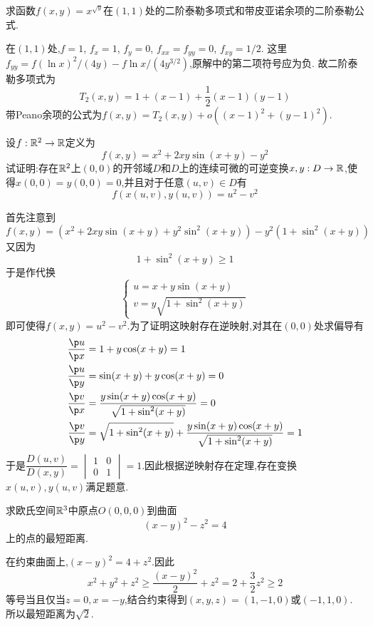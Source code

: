 \documentclass{ctexart}
\begin{document}
\begin{problem}[5.(15\songti{分})]
求函数$f(x,y)=x^{\sqrt{y}}$在$(1,1)$处的二阶泰勒多项式和带皮亚诺余项的二阶泰勒公式.
\end{problem}
\begin{solution}
在$(1,1)$处,$f=1$, $f_x=1$, $f_y=0$, $f_{xx}=f_{yy}=0$, $f_{xy}=1/2$.
这里$f_{yy}=f(\ln x)^2/(4y)-f\ln x/(4y^{3/2})$,原解中的第二项符号应为负.
故二阶泰勒多项式为
\[T_2(x,y)=1+(x-1)+\dfrac12(x-1)(y-1)\]
带Peano余项的公式为$f(x,y)=T_2(x,y)+o((x-1)^2+(y-1)^2)$.
\end{solution}
\begin{problem}[6.(15\songti{分})]
设$f:\mathbb{R}^2\to\mathbb{R}$定义为
        \[f(x,y)=x^2+2xy\sin(x+y)-y^2\]
        试证明:存在$\mathbb{R}^2$上$(0,0)$的开邻域$D$和$D$上的连续可微的可逆变换$x,y:D\to\mathbb{R}$,使得$x(0,0)=y(0,0)=0$,并且对于任意$(u,v)\in D$有
        \[f(x(u,v),y(u,v))=u^2-v^2\]
\end{problem}
\begin{solution}
首先注意到
    \[f(x,y)=\left(x^2+2xy\sin(x+y)+y^2\sin^2(x+y)\right)-y^2\left(1+\sin^2(x+y)\right)\]
    又因为\[1+\sin^2(x+y)\geqslant1\]
    于是作代换
    \[\left\{\begin{array}{l}
        u=x+y\sin(x+y) \\
        v=y\sqrt{1+\sin^2(x+y)}
    \end{array}\right.\]
    即可使得$f(x,y)=u^2-v^2$.为了证明这映射存在逆映射,对其在$(0,0)$处求偏导有
    \[\begin{aligned}
        \dfrac{\p u}{\p x}&=1+y\cos(x+y)=1\\
        \dfrac{\p u}{\p y}&=\sin(x+y)+y\cos(x+y)=0\\
        \dfrac{\p v}{\p x}&=\dfrac{y\sin(x+y)\cos(x+y)}{\sqrt{1+\sin^2(x+y)}}=0\\
        \dfrac{\p v}{\p y}&=\sqrt{1+\sin^2(x+y)}+\dfrac{y\sin(x+y)\cos(x+y)}{\sqrt{1+\sin^2(x+y)}}=1
    \end{aligned}\]
    于是$\dfrac{D(u,v)}{D(x,y)}=\begin{vmatrix}
        1&0\\0&1
    \end{vmatrix}=1$.因此根据逆映射存在定理,存在变换$x(u,v),y(u,v)$满足题意.
\end{solution}
\begin{problem}[7.(15\songti{分})]
求欧氏空间$\mathbb{R}^3$中原点$O(0,0,0)$到曲面\[(x-y)^2-z^2=4\]上的点的最短距离.
\end{problem}
\begin{solution}
在约束曲面上,$(x-y)^2=4+z^2$.因此
\[x^2+y^2+z^2\geqslant\dfrac{(x-y)^2}{2}+z^2
=2+\dfrac32z^2\geqslant2\]
等号当且仅当$z=0,x=-y$,结合约束得到$(x,y,z)=(1,-1,0)$或$(-1,1,0)$.
所以最短距离为$\sqrt2$.
\end{solution}
\end{document}
